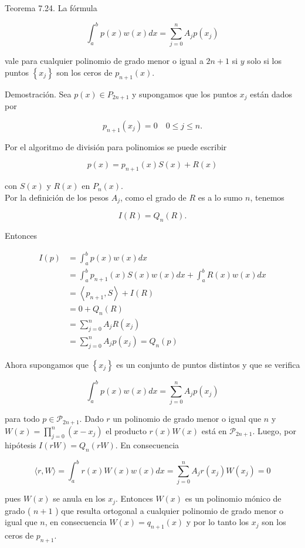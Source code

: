 \documentclass[10pt]{article}
\begin{document}
Teorema 7.24. La fórmula

$$
\int_{a}^{b} p(x) w(x) d x=\sum_{j=0}^{n} A_{j} p\left(x_{j}\right)
$$

vale para cualquier polinomio de grado menor o igual a $2 n+1$ si $y$ solo si los puntos $\left\{x_{j}\right\}$ son los ceros de $p_{n+1}(x)$.

Demostración. Sea $p(x) \in P_{2 n+1}$ y supongamos que los puntos $x_{j}$ están dados por

$$
p_{n+1}\left(x_{j}\right)=0 \quad 0 \leq j \leq n .
$$

Por el algoritmo de división para polinomios se puede escribir

$$
p(x)=p_{n+1}(x) S(x)+R(x)
$$

con $S(x)$ y $R(x)$ en $P_{n}(x)$.\\
Por la definición de los pesos $A_{j}$, como el grado de $R$ es a lo sumo $n$, tenemos

$$
I(R)=Q_{n}(R) .
$$

Entonces

$$
\begin{aligned}
I(p) & =\int_{a}^{b} p(x) w(x) d x \\
& =\int_{a}^{b} p_{n+1}(x) S(x) w(x) d x+\int_{a}^{b} R(x) w(x) d x \\
& =\left\langle p_{n+1}, S\right\rangle+I(R) \\
& =0+Q_{n}(R) \\
& =\sum_{j=0}^{n} A_{j} R\left(x_{j}\right) \\
& =\sum_{j=0}^{n} A_{j} p\left(x_{j}\right)=Q_{n}(p)
\end{aligned}
$$

Ahora supongamos que $\left\{x_{j}\right\}$ es un conjunto de puntos distintos y que se verifica

$$
\int_{a}^{b} p(x) w(x) d x=\sum_{j=0}^{n} A_{j} p\left(x_{j}\right)
$$

para todo $p \in \mathcal{P}_{2 n+1}$. Dado $r$ un polinomio de grado menor o igual que $n$ y $W(x)=\prod_{j=0}^{n}\left(x-x_{j}\right)$ el producto $r(x) W(x)$ está en $\mathcal{P}_{2 n+1}$. Luego, por hipótesis $I(r W)=Q_{n}(r W)$. En consecuencia

$$
\langle r, W\rangle=\int_{a}^{b} r(x) W(x) w(x) d x=\sum_{j=0}^{n} A_{j} r\left(x_{j}\right) W\left(x_{j}\right)=0
$$

pues $W(x)$ se anula en los $x_{j}$. Entonces $W(x)$ es un polinomio mónico de grado ( $n+1$ ) que resulta ortogonal a cualquier polinomio de grado menor o igual que $n$, en consecuencia $W(x)=q_{n+1}(x)$ y por lo tanto los $x_{j}$ son los ceros de $p_{n+1}$.
\end{document}
